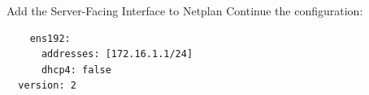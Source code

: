 \begin{frame}[fragile]{Add the Server-Facing Interface to Netplan}
  Continue the  configuration:
  \begin{verbatim}
    ens192:
      addresses: [172.16.1.1/24]
      dhcp4: false
  version: 2
  \end{verbatim}
\end{frame}
